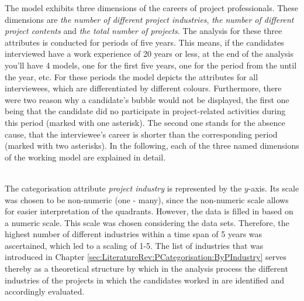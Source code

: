 The model exhibits three dimensions of the careers of project professionals. These dimensions are \textit{the number of different project industries}, \textit{the number of different project contents} and \textit{the total number of projects}. The analysis for these three attributes is conducted for periods of five years. This means, if the candidates interviewed have a work experience of 20 years or less, at the end of the analysis you'll have 4 models, one for the first five years, one for the period from the  until the  year, etc. For these periods the model depicts the attributes for all interviewees, which are differentiated by different colours. Furthermore, there were two reason why a candidate's bubble would not be displayed, the first one being that the candidate did no participate in project-related activities during this period (marked with one asterisk). The second one stands for the absence cause, that the interviewee's career is shorter than the corresponding period (marked with two asterisks). In the following, each of the three named dimensions of the working model are explained in detail.\\

\clearpage

\\[.1cm]
The categorisation attribute \textit{project industry} is represented by the $y$-axis. Its scale was chosen to be non-numeric (one - many), since the non-numeric scale  allows for easier interpretation of the quadrants. However, the data is filled in based on a numeric scale. This scale was chosen considering the data sets. Therefore, the highest number of different industries within a time span of 5 years was ascertained, which led to a scaling of 1-5. The list of industries that was introduced in Chapter \ref{sec:LiteratureRev:PCategorisation:ByPIndustry} serves thereby as a theoretical structure by which in the analysis process the different industries of the projects in which the candidates worked in are identified and accordingly evaluated. \\

